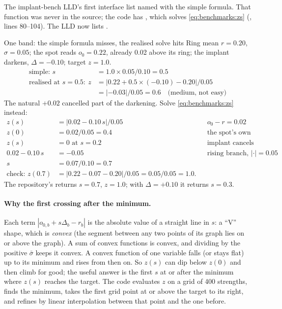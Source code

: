 \begin{sourcenote}
The implant-bench LLD's first interface list named  with the simple formula. That function was
never in the source; the code has , which solves \cref{eq:benchmarks:zs}
(, lines 80--104). The LLD now lists .
\end{sourcenote}

\begin{worked}[label={we:benchmarks:solve}]{One band: the simple formula misses, the realised solve hits}
Ring mean $r = 0.20$, $\sigma = 0.05$; the spot reads $o_0 = 0.22$, already 0.02 above its ring; the implant darkens,
$\Delta = -0.10$; target $z = 1.0$.
\begin{align*}
\text{simple: } s &= 1.0 \times 0.05 / 0.10 = 0.5\\
\text{realised at } s = 0.5: \ z &= |0.22 + 0.5 \times (-0.10) - 0.20| / 0.05\\
&= |{-0.03}| / 0.05 = 0.6 \quad \text{(medium, not easy)}
\end{align*}
The natural $+0.02$ cancelled part of the darkening. Solve \cref{eq:benchmarks:zs} instead:
\begin{align*}
z(s) &= |0.02 - 0.10\,s| / 0.05 && o_0 - r = 0.02\\
z(0) &= 0.02 / 0.05 = 0.4 && \text{the spot's own contrast}\\
z(s) &= 0 \text{ at } s = 0.2 && \text{implant cancels the offset}\\
0.02 - 0.10\,s &= -0.05 && \text{rising branch, } |\cdot| = 0.05\\
s &= 0.07 / 0.10 = 0.7\\
\text{check: } z(0.7) &= |0.22 - 0.07 - 0.20| / 0.05 = 0.05 / 0.05 = 1.0.
\end{align*}
The repository's  returns $s = 0.7$, $z = 1.0$; with $\Delta = +0.10$ it returns $s = 0.3$\tagC{}.
\end{worked}

\paragraph{Why the first crossing after the minimum.} Each term $|o_{0,b} + s\Delta_b - r_b|$ is the absolute value of
a straight line in $s$: a ``V'' shape, which is \emph{convex} (the segment between any two points of its graph lies on
or above the graph). A sum of convex functions is convex, and dividing by the positive $\bar\sigma$ keeps it convex.
A convex function of one variable falls (or stays flat) up to its minimum and rises from then on. So $z(s)$ can dip
below $z(0)$ and then climb for good; the useful answer is the first $s$ at or after the minimum where $z(s)$ reaches
the target. The code evaluates $z$ on a grid of 400 strengths, finds the minimum, takes the first grid point at or
above the target to its right, and refines by linear interpolation between that point and the one before.


